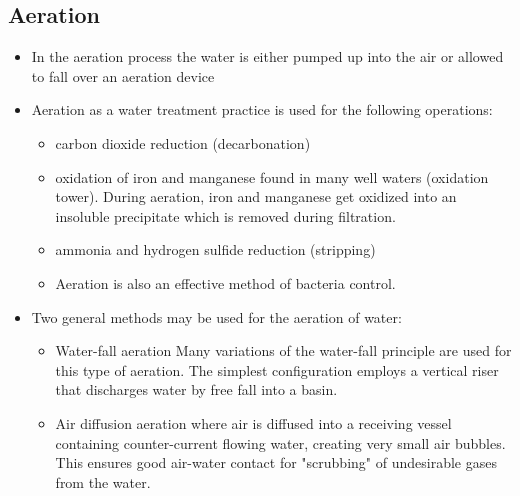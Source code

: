 \subsection{Aeration}
\begin{itemize}
\item In the aeration process the water is either pumped up into the air or allowed to fall over an aeration device

\item Aeration as a water treatment practice is used for the following operations:
\begin{itemize}
\item carbon dioxide reduction (decarbonation)
\item oxidation of iron and manganese found in many well waters (oxidation tower).  During aeration, iron and manganese get oxidized into an insoluble precipitate which is removed during filtration.
\item ammonia and hydrogen sulfide reduction (stripping)
\item Aeration is also an effective method of bacteria control.
\end{itemize}
\item Two general methods may be used for the aeration of water:
\begin{itemize}
\item Water-fall aeration Many variations of the water-fall principle are used for this type of aeration. The simplest configuration employs a vertical riser that discharges water by free fall into a basin.
\item Air diffusion aeration where air is diffused into a receiving vessel containing counter-current flowing water, creating very small air bubbles. This ensures good air-water contact for "scrubbing" of undesirable gases from the water.
\end{itemize}
\end{itemize}



